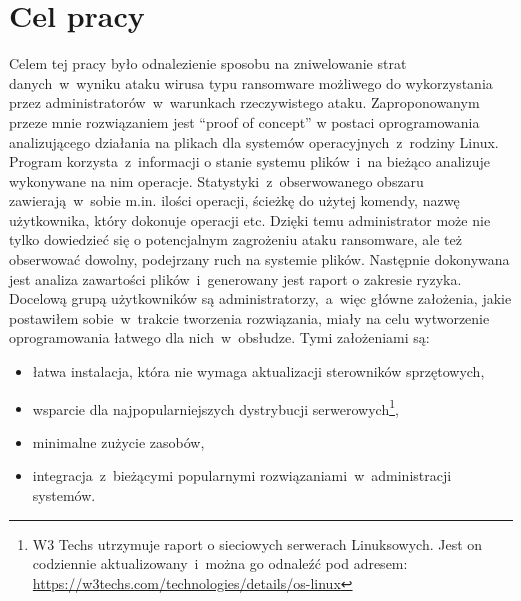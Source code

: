 \section{Cel pracy}
Celem tej pracy było odnalezienie sposobu na zniwelowanie strat danych~w~wyniku ataku wirusa typu ransomware możliwego do wykorzystania przez administratorów~w~warunkach rzeczywistego ataku. Zaproponowanym przeze mnie rozwiązaniem jest \foreignquote{english}{proof of concept} w postaci oprogramowania analizującego działania na plikach dla systemów operacyjnych~z~rodziny Linux.
 Program korzysta~z~informacji o stanie systemu plików~i~na bieżąco analizuje wykonywane na nim operacje. Statystyki~z~obserwowanego obszaru zawierają~w~sobie m.in. ilości operacji, ścieżkę do użytej komendy, nazwę użytkownika, który dokonuje operacji etc. Dzięki temu administrator może nie tylko dowiedzieć się o potencjalnym zagrożeniu ataku ransomware, ale też obserwować dowolny, podejrzany ruch na systemie plików. Następnie dokonywana jest analiza zawartości plików~i~generowany jest raport o zakresie ryzyka.
Docelową grupą użytkowników są administratorzy,~a~więc główne założenia, jakie postawiłem sobie~w~trakcie tworzenia rozwiązania, miały na celu wytworzenie oprogramowania łatwego dla nich~w~obsłudze. Tymi założeniami są:
\begin{itemize}
    \item łatwa instalacja, która nie wymaga aktualizacji sterowników sprzętowych,
    \item wsparcie dla najpopularniejszych dystrybucji serwerowych\footnote{W3 Techs utrzymuje raport o sieciowych serwerach Linuksowych. Jest on codziennie aktualizowany~i~można go odnaleźć pod adresem: \url{https://w3techs.com/technologies/details/os-linux}},
    \item minimalne zużycie zasobów,
    \item integracja~z~bieżącymi popularnymi rozwiązaniami~w~administracji systemów.
\end{itemize}

